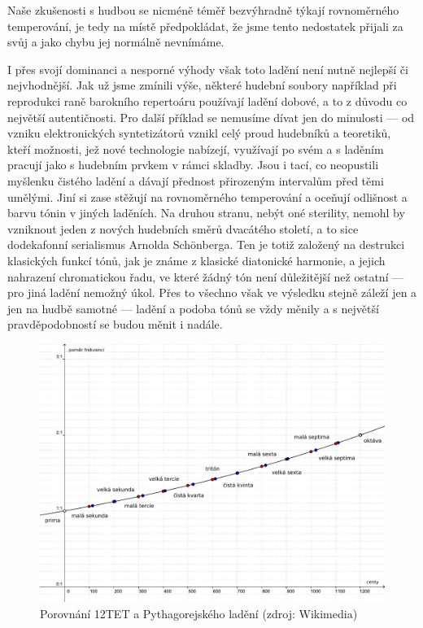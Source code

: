 \documentclass[12pt]{article}
\begin{document}
Naše zkušenosti s hudbou se nicméně téměř bezvýhradně týkají rovnoměrného temperování, je tedy na místě předpokládat, že jsme tento nedostatek přijali za svůj a jako chybu jej normálně nevnímáme.

I přes svojí dominanci a nesporné výhody však toto ladění není nutně nejlepší či nejvhodnější. Jak už jsme zmínili výše, některé hudební soubory například při reprodukci raně barokního repertoáru používají ladění dobové, a to z důvodu co největší autentičnosti. Pro další příklad se nemusíme dívat jen do minulosti — od vzniku elektronických syntetizátorů vznikl celý proud hudebníků a teoretiků, kteří možnosti, jež nové technologie nabízejí, využívají po svém a s laděním pracují jako s hudebním prvkem v rámci skladby. Jsou i tací, co neopustili myšlenku čistého ladění a dávají přednost přirozeným intervalům před těmi umělými. Jiní si zase stěžují na  rovnoměrného temperování a oceňují odlišnost a barvu tónin v jiných laděních. Na druhou stranu, nebýt oné sterility, nemohl by vzniknout jeden z nových hudebních směrů dvacátého století, a to sice dodekafonní serialismus Arnolda Schönberga. Ten je totiž založený na destrukci klasických funkcí tónů, jak je známe z klasické diatonické harmonie, a jejich nahrazení chromatickou řadu, ve které žádný tón není důležitější než ostatní — pro jiná ladění nemožný úkol. Přes to všechno však ve výsledku stejně záleží jen a jen na hudbě samotné — ladění a podoba tónů se vždy měnily a s největší pravděpodobností se budou měnit i nadále.

\begin{figure}[p]\centering
	\includegraphics[width = \textwidth]{et_pyth_comparison.pdf}
	\caption{Porovnání 12TET a Pythagorejského ladění (zdroj: Wikimedia)}
	\label{fig:et_pyth_comparison}
\end{figure}

\pagebreak

{}

\end{document}
